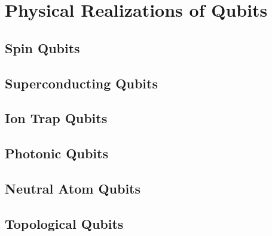 \chapter{Physical Realizations of Qubits}

\section{Spin Qubits}

\section{Superconducting Qubits}

\section{Ion Trap Qubits}

\section{Photonic Qubits}

\section{Neutral Atom Qubits}

\section{Topological Qubits}





